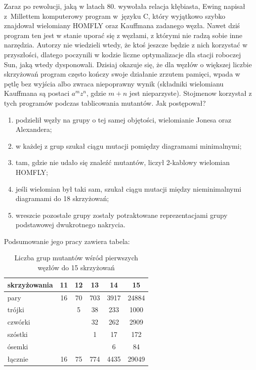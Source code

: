Zaraz po rewolucji, jaką w latach 80. wywołała relacja kłębiasta, Ewing napisał z~Millettem komputerowy program w~języku C, który wyjątkowo szybko znajdował wielomiany HOMFLY oraz Kauffmana zadanego węzła.
%
%
Nawet dziś program ten jest w stanie uporać się z węzłami, z którymi nie radzą sobie inne narzędzia.
Autorzy nie wiedzieli wtedy, że ktoś jeszcze będzie z nich korzystać w przyszłości, dlatego poczynili w kodzie liczne optymalizacje dla stacji roboczej Sun, jaką wtedy dysponowali.
Dzisiaj okazuje się, że dla węzłów o większej liczbie skrzyżowań program często kończy swoje działanie zrzutem pamięci, wpada w pętlę bez wyjścia albo zwraca niepoprawny wynik (składniki wielomianu Kauffmana są postaci $a^m z^n$, gdzie $m + n$ jest nieparzyste).
Stojmenow korzystał z tych programów podczas tablicowania mutantów.
Jak postępował?
\begin{enumerate}
    \item podzielił węzły na grupy o tej samej objętości, wielomianie Jonesa oraz Alexandera;
    \item w każdej z grup szukał ciągu mutacji pomiędzy diagramami minimalnymi;
    \item tam, gdzie nie udało się znaleźć mutantów, liczył 2-kablowy wielomian HOMFLY;
    \item jeśli wielomian był taki sam, szukał ciągu mutacji między nieminimalnymi diagramami do 18 skrzyżowań;
    \item wreszcie pozostałe grupy zostały potraktowane reprezentacjami grupy podstawowej dwukrotnego nakrycia.
\end{enumerate}

Podsumowanie jego pracy zawiera tabela:

\begin{table}[H]
    \centering
    \begin{tabular}{lccccc} \toprule
        skrzyżowania & 11 & 12 & 13  & 14   & 15    \\ \midrule
        pary         & 16 & 70 & 703 & 3917 & 24884 \\
        trójki       &    & 5  & 38  & 233  & 1000  \\
        czwórki      &    &    & 32  & 262  & 2909  \\
        szóstki      &    &    & 1   & 17   & 172   \\
        ósemki       &    &    &     & 6    & 84    \\
        łącznie      & 16 & 75 & 774 & 4435 & 29049 \\
        \bottomrule
        \hline
    \end{tabular}
    \caption{Liczba grup mutantów wśród pierwszych węzłów do 15 skrzyżowań}
\end{table}


